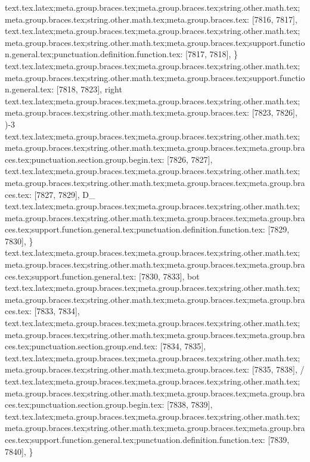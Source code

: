{{{{{{{{{{{{{{{{{{{{{{{{{{{{{{{{{{{{{{{{{{{{{{{{{{{{{{{{{{{{{{{{{{{{{{{{{{{{{{{{{{{{{{{{{{{{{{{{{{{{{{{{{{{{{{{{{{{{{{{{{{{{{{{{{{{{{{{{{{{{{{{{{{{{{{{{{{{{{{{{{{{{{{{{{{{{{{{{{{{{{{{{{{{{{{{{{{{{{{{{{{{{{{{{{{{{{{{{{{{{{{{{{{{{{{text.tex.latex;meta.group.braces.tex;meta.group.braces.tex;string.other.math.tex;meta.group.braces.tex;string.other.math.tex;meta.group.braces.tex: [7816, 7817], { }
text.tex.latex;meta.group.braces.tex;meta.group.braces.tex;string.other.math.tex;meta.group.braces.tex;string.other.math.tex;meta.group.braces.tex;support.function.general.tex;punctuation.definition.function.tex: [7817, 7818], {\}
text.tex.latex;meta.group.braces.tex;meta.group.braces.tex;string.other.math.tex;meta.group.braces.tex;string.other.math.tex;meta.group.braces.tex;support.function.general.tex: [7818, 7823], {right}
text.tex.latex;meta.group.braces.tex;meta.group.braces.tex;string.other.math.tex;meta.group.braces.tex;string.other.math.tex;meta.group.braces.tex: [7823, 7826], {)-3}
text.tex.latex;meta.group.braces.tex;meta.group.braces.tex;string.other.math.tex;meta.group.braces.tex;string.other.math.tex;meta.group.braces.tex;meta.group.braces.tex;punctuation.section.group.begin.tex: [7826, 7827], {{}
text.tex.latex;meta.group.braces.tex;meta.group.braces.tex;string.other.math.tex;meta.group.braces.tex;string.other.math.tex;meta.group.braces.tex;meta.group.braces.tex: [7827, 7829], {D_}
text.tex.latex;meta.group.braces.tex;meta.group.braces.tex;string.other.math.tex;meta.group.braces.tex;string.other.math.tex;meta.group.braces.tex;meta.group.braces.tex;support.function.general.tex;punctuation.definition.function.tex: [7829, 7830], {\}
text.tex.latex;meta.group.braces.tex;meta.group.braces.tex;string.other.math.tex;meta.group.braces.tex;string.other.math.tex;meta.group.braces.tex;meta.group.braces.tex;support.function.general.tex: [7830, 7833], {bot}
text.tex.latex;meta.group.braces.tex;meta.group.braces.tex;string.other.math.tex;meta.group.braces.tex;string.other.math.tex;meta.group.braces.tex;meta.group.braces.tex: [7833, 7834], { }
text.tex.latex;meta.group.braces.tex;meta.group.braces.tex;string.other.math.tex;meta.group.braces.tex;string.other.math.tex;meta.group.braces.tex;meta.group.braces.tex;punctuation.section.group.end.tex: [7834, 7835], {}}
text.tex.latex;meta.group.braces.tex;meta.group.braces.tex;string.other.math.tex;meta.group.braces.tex;string.other.math.tex;meta.group.braces.tex: [7835, 7838], { / }
text.tex.latex;meta.group.braces.tex;meta.group.braces.tex;string.other.math.tex;meta.group.braces.tex;string.other.math.tex;meta.group.braces.tex;meta.group.braces.tex;punctuation.section.group.begin.tex: [7838, 7839], {{}
text.tex.latex;meta.group.braces.tex;meta.group.braces.tex;string.other.math.tex;meta.group.braces.tex;string.other.math.tex;meta.group.braces.tex;meta.group.braces.tex;support.function.general.tex;punctuation.definition.function.tex: [7839, 7840], {\}
}}}}}}}}}}}}}}}}}}}}}}}}}}}}}}}}}}}}}}}}}}}}}}}}}}}}}}}}}}}}}}}}}}}}}}}}}}}}}}}}}}}}}}}}}}}}}}}}}}}}}}}}}}}}}}}}}}}}}}}}}}}}}}}}}}}}}}}}}}}}}}}}}}}}}}}}}}}}}}}}}}}}}}}}}}}}}}}}}}}}}}}}}}}}}}}}}}}}}}}}}}}}}}}}}}}}}}}}}}}}}}}}}}}}}}}}}}
